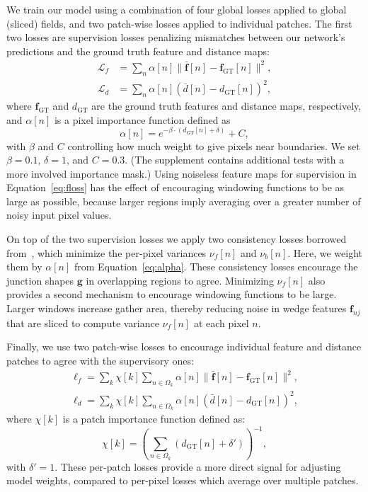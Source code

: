 \documentclass[main.tex]{subfiles}
\begin{document}
We train our model using a combination of four global losses applied to global (\ie sliced) fields, and two patch-wise losses applied to individual patches. The first two losses are supervision losses penalizing mismatches between our network's predictions and the ground truth feature and distance maps:
\begin{align}
    \mathcal{L}_f &= \sum_{n} \alpha[n] \|\bar{\mathbf{f}}[n] - \mathbf{f}_{\text{GT}}[n]\|^2, \label{eq:floss}\\
    \mathcal{L}_d &= \sum_{n} \alpha[n] \left(\bar{d}[n] - d_{\text{GT}}[n]\right)^2,
\end{align}
where $\mathbf{f}_{\text{GT}}$ and $d_{\text{GT}}$ are the ground truth features and distance maps, respectively, and $\alpha[n]$ is a pixel importance function defined as
\begin{equation} \label{eq:alpha}
    \alpha[n] = e^{-\beta \cdot (d_{\text{GT}}[n] + \delta)} + C,
\end{equation}
with $\beta$ and $C$ controlling how much weight to give pixels near boundaries. We set $\beta = 0.1$, $\delta = 1$, and $C=0.3$. (The supplement contains additional tests with a more involved importance mask.)
Using noiseless feature maps for supervision in Equation~\ref{eq:floss} has the effect of encouraging windowing functions to be as large as possible, because larger regions imply averaging over a greater number of noisy input pixel values.

On top of the two supervision losses we apply two consistency losses borrowed from~\cite{verbin2021field}, which minimize the per-pixel variances $\nu_f[n]$ and $\nu_b[n]$. Here, we weight them by $\alpha[n]$ from Equation~\ref{eq:alpha}. These consistency losses encourage the junction shapes $\mathbf{g}$ in overlapping regions to agree. Minimizing $\nu_f[n]$ also provides a second mechanism to encourage windowing functions to be large. Larger windows increase gather area, thereby reducing noise in wedge features $\mathbf{f}_{nj}$ that are sliced to compute variance $\nu_f[n]$ at each pixel $n$.

Finally, we use two patch-wise losses to encourage individual  feature and distance patches to agree with the supervisory ones:
\begin{align}
    \ell_f = \sum_k \chi[k] \sum_{n \in \Omega_k} \alpha[n] \|\bar{\mathbf{f}}[n] - \mathbf{f}_\text{GT}[n]\|^2, \\
    \ell_d = \sum_k \chi[k] \sum_{n\in\Omega_k} \alpha[n] (\bar{d}[n] - d_{\text{GT}}[n])^2,
\end{align}
where $\chi[k]$ is a patch importance function defined as:
\begin{equation}
    \chi[k] = \left(\sum_{n\in\Omega_k}(d_\text{GT}[n] + \delta')\right)^{-1},
\end{equation}
with $\delta' = 1$. These per-patch losses provide a more direct signal for adjusting model weights, compared to per-pixel losses which average over multiple patches. 
\end{document}
